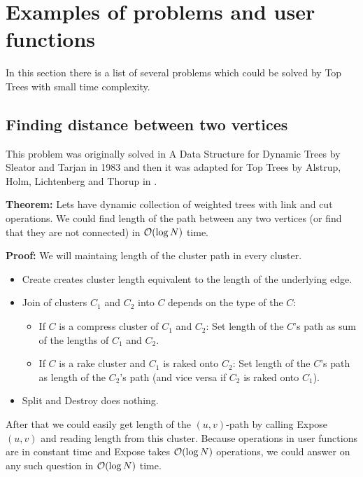 \chapter{Examples of problems and user functions}
\label{chap:Problems}

In this section there is a list of several problems which could be solved by
Top Trees with small time complexity.

\section{Finding distance between two vertices}

This problem was originally solved in {\I A Data Structure for Dynamic Trees}
\cite{DSforDynamicTrees} by Sleator and Tarjan in 1983 and then it was adapted
for Top Trees by Alstrup, Holm, Lichtenberg and Thorup in \cite{TopTrees}.

{\bf Theorem:} Lets have dynamic collection of weighted trees with link and cut
operations. We could find length of the path between any two vertices (or find
that they are not connected) in ${\cal O}(\log N)$ time.

\medskip\noindent
{\bf Proof:} We will maintaing length of the cluster path in every cluster.

\begin{itemize}

\item {\sc Create} creates cluster length equivalent to the length of the
underlying edge.

\item {\sc Join} of clusters $C_1$ and $C_2$ into $C$ depends on the type of the $C$:
	\begin{itemize}
	\item If $C$ is a compress cluster of $C_1$ and $C_2$:
	Set length of the $C$'s path as sum of the lengths of $C_1$ and $C_2$.
	\item If $C$ is a rake cluster and $C_1$ is raked onto $C_2$:
	Set length of the $C$'s path as length of the $C_2$'s path (and vice
	versa if $C_2$ is raked onto $C_1$).
	\end{itemize}

\item {\sc Split} and {\sc Destroy} does nothing.

\end{itemize}

After that we could easily get length of the $(u,v)$-path by calling
{\sc Expose}$(u,v)$ and reading length from this cluster. Because operations
in user functions are in constant time and {\sc Expose} takes ${\cal O}(\log N)$
operations, we could answer on any such question in ${\cal O}(\log N)$ time.

